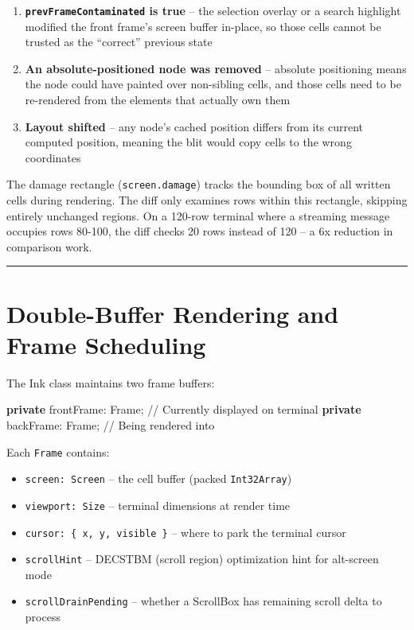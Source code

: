 \documentclass[
  english,
  11pt,
  letterpaper,
]{book}
\newenvironment{Shaded}{\begin{snugshade}}{\end{snugshade}}
\newcommand{\CommentTok}[1]{\textcolor[rgb]{0.37,0.37,0.37}{#1}}
\newcommand{\KeywordTok}[1]{\textcolor[rgb]{0.00,0.23,0.31}{\textbf{#1}}}
\newcommand{\NormalTok}[1]{\textcolor[rgb]{0.00,0.23,0.31}{#1}}
\newcommand{\OperatorTok}[1]{\textcolor[rgb]{0.37,0.37,0.37}{#1}}
\providecommand{\tightlist}{%
  \setlength{\itemsep}{0pt}\setlength{\parskip}{0pt}}
\begin{document}
\begin{enumerate}
\def\labelenumi{\arabic{enumi}.}
\tightlist
\item
  \textbf{\texttt{prevFrameContaminated} is true} -- the selection
  overlay or a search highlight modified the front frame's screen buffer
  in-place, so those cells cannot be trusted as the ``correct'' previous
  state
\item
  \textbf{An absolute-positioned node was removed} -- absolute
  positioning means the node could have painted over non-sibling cells,
  and those cells need to be re-rendered from the elements that actually
  own them
\item
  \textbf{Layout shifted} -- any node's cached position differs from its
  current computed position, meaning the blit would copy cells to the
  wrong coordinates
\end{enumerate}

The damage rectangle (\texttt{screen.damage}) tracks the bounding box of
all written cells during rendering. The diff only examines rows within
this rectangle, skipping entirely unchanged regions. On a 120-row
terminal where a streaming message occupies rows 80-100, the diff checks
20 rows instead of 120 -- a 6x reduction in comparison work.

\begin{center}\rule{0.5\linewidth}{0.5pt}\end{center}

\section{Double-Buffer Rendering and Frame
Scheduling}\label{double-buffer-rendering-and-frame-scheduling}

The Ink class maintains two frame buffers:

\begin{Shaded}
\begin{Highlighting}[]
\KeywordTok{private}\NormalTok{ frontFrame}\OperatorTok{:}\NormalTok{ Frame}\OperatorTok{;}  \CommentTok{// Currently displayed on terminal}
\KeywordTok{private}\NormalTok{ backFrame}\OperatorTok{:}\NormalTok{ Frame}\OperatorTok{;}   \CommentTok{// Being rendered into}
\end{Highlighting}
\end{Shaded}

Each \texttt{Frame} contains:

\begin{itemize}
\tightlist
\item
  \texttt{screen:\ Screen} -- the cell buffer (packed
  \texttt{Int32Array})
\item
  \texttt{viewport:\ Size} -- terminal dimensions at render time
\item
  \texttt{cursor:\ \{\ x,\ y,\ visible\ \}} -- where to park the
  terminal cursor
\item
  \texttt{scrollHint} -- DECSTBM (scroll region) optimization hint for
  alt-screen mode
\item
  \texttt{scrollDrainPending} -- whether a ScrollBox has remaining
  scroll delta to process
\end{itemize}
\end{document}
